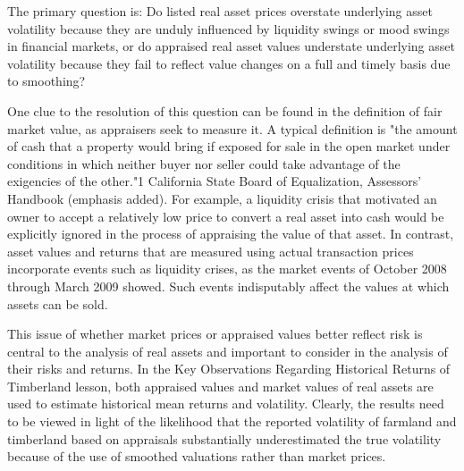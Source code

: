\documentclass[11pt]{article}
\begin{document}
The primary question is: Do listed real asset prices overstate underlying asset volatility because they are unduly influenced by liquidity swings or mood swings in financial markets, or do appraised real asset values understate underlying asset volatility because they fail to reflect value changes on a full and timely basis due to smoothing?

One clue to the resolution of this question can be found in the definition of fair market value, as appraisers seek to measure it. A typical definition is "the amount of cash that a property would bring if exposed for sale in the open market under conditions in which neither buyer nor seller could take advantage of the exigencies of the other."1 California State Board of Equalization, Assessors' Handbook (emphasis added). For example, a liquidity crisis that motivated an owner to accept a relatively low price to convert a real asset into cash would be explicitly ignored in the process of appraising the value of that asset. In contrast, asset values and returns that are measured using actual transaction prices incorporate events such as liquidity crises, as the market events of October 2008 through March 2009 showed. Such events indisputably affect the values at which assets can be sold.

This issue of whether market prices or appraised values better reflect risk is central to the analysis of real assets and important to consider in the analysis of their risks and returns. In the Key Observations Regarding Historical Returns of Timberland lesson, both appraised values and market values of real assets are used to estimate historical mean returns and volatility. Clearly, the results need to be viewed in light of the likelihood that the reported volatility of farmland and timberland based on appraisals substantially underestimated the true volatility because of the use of smoothed valuations rather than market prices.
\end{document}
